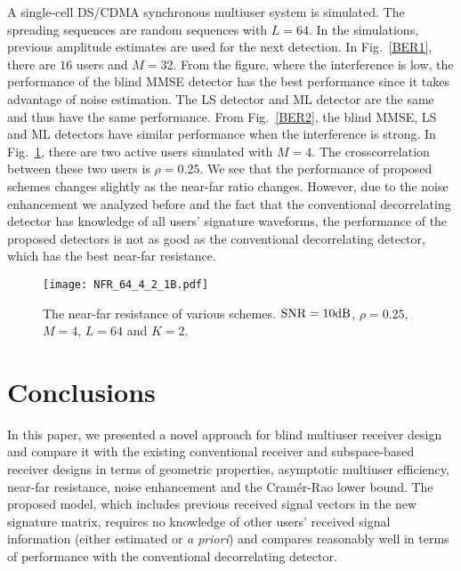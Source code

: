 \documentclass[conference]{IEEEtran}
\begin{document}
A single-cell DS/CDMA synchronous multiuser system is simulated. The spreading sequences are random sequences with $L=64$. In
the simulations, previous amplitude estimates are used for the
next detection.  In Fig.~\ref{BER1}, there are $16$ users and $M=32$. From the figure, where the interference is low, the
performance of the blind MMSE detector has the best performance
since it takes advantage of noise estimation. The LS detector
and ML detector are the same and thus have the same performance. From Fig.~\ref{BER2}, the blind
MMSE, LS and ML detectors have similar performance when the
interference is strong. In Fig.~\ref{NFR}, there are two active users
simulated with $M=4$.  The crosscorrelation between these
two users is $\rho=0.25$. We see that the performance of
proposed schemes changes slightly as the near-far
ratio changes.  However, due to the noise enhancement we analyzed before and the fact that the conventional decorrelating detector has knowledge of all users' signature waveforms,
the performance of the proposed detectors is not as good as the conventional decorrelating
detector, which has the best near-far resistance.

\begin{figure}
\centerline{\texttt{[image: NFR\_64\_4\_2\_1B.pdf]}}
\caption{ The near-far resistance of various schemes. ${\rm
SNR}=10{\rm dB}$, $\rho=0.25$, $M=4$, $L=64$ and $K=2$.}
\label{NFR}
\end{figure}

\section{Conclusions}

In this paper, we presented a novel approach for blind multiuser
receiver design and compare it with the existing
conventional  receiver and subspace-based receiver designs in
terms of geometric properties, asymptotic multiuser efficiency,
near-far resistance, noise enhancement and the Cram\'{e}r-Rao lower
bound.  The proposed model, which includes previous received signal vectors in the new signature matrix, requires no knowledge of other users' received signal information (either estimated or {\em a priori}) and compares reasonably well in terms of performance with the conventional decorrelating detector.



\end{document}
